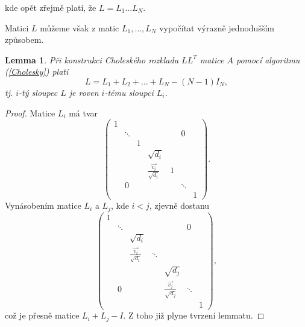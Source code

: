 \documentclass[11pt,american,czech,oneside]{book}
\theoremstyle{plain}
\newtheorem{lemma}{Lemma}
\theoremstyle{definition}
\begin{document}
kde opět zřejmě platí, že $L=L_1...L_N$.

\medskip

Matici $L$ můžeme však z matic $L_1,\ldots,L_N$ vypočítat výrazně jednodušším způsobem.

\begin{lemma}
\label{Lsoucet}
    Při konstrukci Choleského rozkladu $LL^T$ matice $A$ pomocí algoritmu (\ref{Cholesky}) platí
    \begin{equation}
      L = L_1 + L_2 + \ldots + L_N - (N-1)I_N,
    \end{equation}
    tj. $i$-tý sloupec $L$ je roven $i$-tému sloupci $L_i$.
\end{lemma}
\begin{proof}
  Matice $L_i$ má tvar
  \[
  \left(
  \begin{matrix}
    1 &        &   &                              &   &        &   \\
      & \ddots &   &                              &   & 0      &   \\
      &        & 1 &                              &   &        &   \\
      &        &   & \sqrt{d_i}                   &   &        &   \\
      &        &   & \frac{\vec{v_i}}{\sqrt{d_i}} & 1 &        &   \\
      & 0      &   &                              &   & \ddots &   \\
      &        &   &                              &   &        & 1
  \end{matrix}
  \right).
  \]
  Vynásobením matice $L_i$ a $L_j$, kde $i < j$, zjevně dostanu
  \[
  \left(
  \begin{matrix}
    1 &        &   &                              &   &        &   \\
      & \ddots &   &                              &   & 0      &   \\
      &        & \sqrt{d_i} &     &   &        &   \\
      &        & \frac{\vec{v_i}}{\sqrt{d_i}}  &     \ddots               &   &        &   \\
      &        &   &  & \sqrt{d_j} &        &   \\
      & 0      &   &  & \frac{\vec{v_j}}{\sqrt{d_j}}  & \ddots &   \\
      &        &   &  &   &        & 1
  \end{matrix}
  \right),
  \]
  což je přesně matice $L_i + L_j - I$.
  Z toho již plyne tvrzení lemmatu.
\end{proof}
\end{document}
